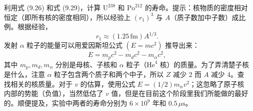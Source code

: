 \begin{question}
利用式 (9.26) 和式 (9.29)，计算 $\mathrm U^{238}$ 和 $\mathrm{Po}^{212}$ 的寿命。提示：核物质的密度相对恒定（即所有核的密度相同），所以经验上 $(r_1)^3$ 与 $A$（质子数加中子数）成比例。根据经验，
\[
r_1\approx (1.25\,\mathrm{fm})A^{1/3}.
\]
发射 $\alpha$ 粒子的能量可以用爱因斯坦公式 $(E=mc^2)$ 推导出来：
\[
E=m_pc^2-m_dc^2-m_\alpha c^2,
\]
其中 $m_p,m_d,m_\alpha$ 分别是母核、子核和 $\alpha$ 粒子（$\mathrm{He}^4$ 核）的质量。为了弄清楚子核是什么，注意 $\alpha$ 粒子包含两个质子和两个中子，所以 $Z$ 减少 2 而 $A$ 减少 4。查找相关的核质量。对于 $v$ 的估算，使用公式 $E=(1/2)m_\alpha v^2$；这忽略了原子核内部的势能（负值），当然低估了 $v$ 值，但是在目前这个阶段里我们所能做的最好的。顺便提及，实验中两者的寿命分别为 $6\times10^9$ 年和 $0.5\,\mu\mathrm{s}$。

\par\smallskip
{}

\end{question}
